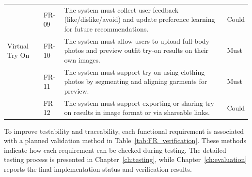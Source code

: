 \begin{table}[ht]
\begin{tabular}{p{2.8cm}p{1.6cm}p{9cm}p{1.4cm}}
          &
    FR-09 &
    The system must collect user feedback (like/dislike/avoid) and update preference learning for future recommendations. &
    Could \\
    
    Virtual Try-On &
    FR-10 &
    The system must allow users to upload full-body photos and preview outfit try-on results on their own images. &
    Must \\
    
          &
    FR-11 &
    The system must support try-on using clothing photos by segmenting and aligning garments for preview. & 
    Must \\
    
          &
    FR-12 &
    The system must support exporting or sharing try-on results in image format or via shareable links. &
    Could \\
    
    \bottomrule
\end{tabular}
\end{table}

To improve testability and traceability, each functional requirement is associated with a planned validation method in Table~\ref{tab:FR_verification}. These methods indicate how each requirement can be checked during testing. The detailed testing process is presented in Chapter~\ref{ch:testing}, while Chapter~\ref{ch:evaluation} reports the final implementation status and verification results.

